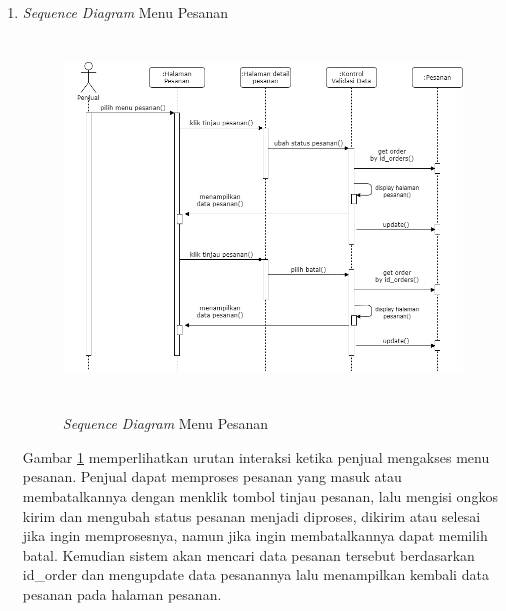\begin{enumerate}
	\newpage
	\item \textit{Sequence Diagram} Menu Pesanan
	\begin{figure}[H]
		\centering
		{\includegraphics [width = 12.5cm, height= 9.5cm]{gambar/sequence/proses pesanan}}
		\caption{\textit{Sequence Diagram} Menu Pesanan}
		\label{seq pesanan}
	\end{figure}
	\par Gambar \ref*{seq pesanan} memperlihatkan urutan interaksi ketika penjual mengakses menu pesanan. Penjual dapat memproses pesanan yang masuk atau membatalkannya dengan menklik tombol tinjau pesanan, lalu mengisi ongkos kirim dan mengubah status pesanan menjadi diproses, dikirim atau selesai jika ingin memprosesnya, namun jika ingin membatalkannya dapat memilih batal. Kemudian sistem akan mencari data pesanan tersebut berdasarkan id\_order dan mengupdate data pesanannya lalu menampilkan kembali data pesanan pada halaman pesanan.


\end{enumerate}
